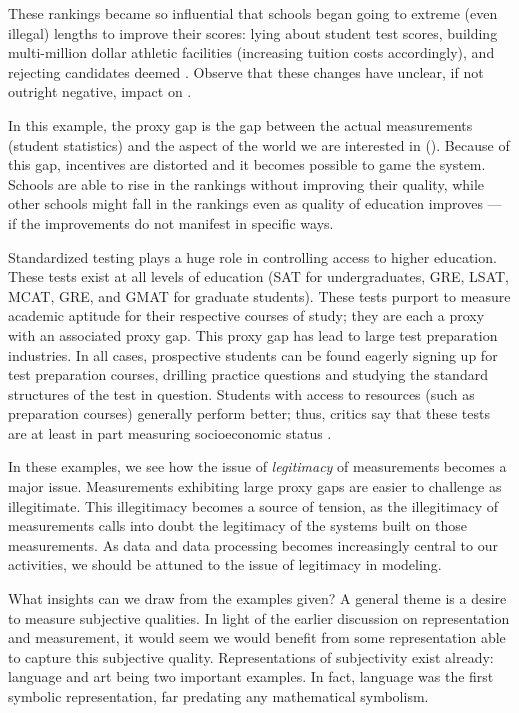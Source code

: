 \documentclass[12pt]{book}
\begin{document}
These rankings became so influential that schools began going to extreme (even illegal) lengths to improve their scores: lying about student test scores, building multi-million dollar athletic facilities (increasing tuition costs accordingly), and rejecting candidates deemed  \cite{oneil}.
Observe that these changes have unclear, if not outright negative, impact on .

 In this example, the proxy gap is the gap between the actual measurements (student statistics) and the aspect of the world we are interested in ().
 Because of this gap, incentives are distorted and it becomes possible to game the system.
 Schools are able to rise in the rankings without improving their quality, while other schools might fall in the rankings even as quality of education improves --- if the improvements do not manifest in specific ways.

\bigskip

Standardized testing plays a huge role in controlling access to higher education.
These tests exist at all levels of education (SAT for undergraduates, GRE, LSAT, MCAT, GRE, and GMAT for graduate students).
These tests purport to measure academic aptitude for their respective courses of study; they are each a proxy with an associated proxy gap.
This proxy gap has lead to large test preparation industries.
In all cases, prospective students can be found eagerly signing up for test preparation courses, drilling practice questions and studying the standard structures of the test in question.
Students with access to resources (such as preparation courses) generally perform better; thus, critics say that these tests are at least in part measuring socioeconomic status \cite{zumbrin}.

\bigskip

In these examples, we see how the issue of \textit{legitimacy} of measurements becomes a major issue.
Measurements exhibiting large proxy gaps are easier to challenge as illegitimate.
This illegitimacy becomes a source of tension, as the illegitimacy of measurements calls into doubt the legitimacy of the systems built on those measurements.
As data and data processing becomes increasingly central to our activities, we should be attuned to the issue of legitimacy in modeling.

What insights can we draw from the examples given?
A general theme is a desire to measure subjective qualities.
In light of the earlier discussion on representation and measurement, it would seem we would benefit from some representation able to capture this subjective quality.
Representations of subjectivity exist already: language and art being two important examples.
In fact, language was the first symbolic representation, far predating any mathematical symbolism.
\end{document}
